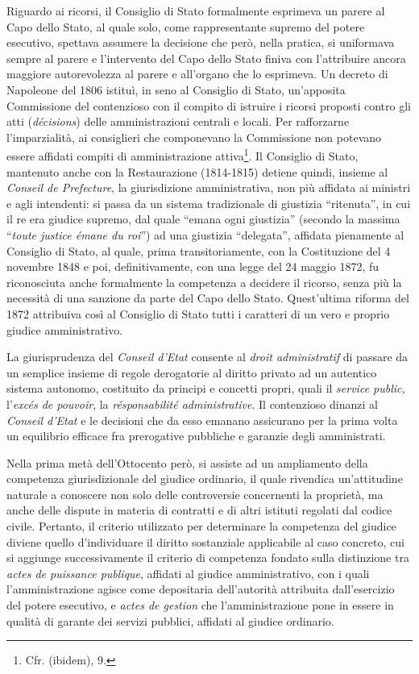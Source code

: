\documentclass[12pt,it,a4paper,]{report}
\begin{document}
Riguardo ai ricorsi, il Consiglio di Stato formalmente esprimeva un
parere al Capo dello Stato, al quale solo, come rappresentante supremo
del potere esecutivo, spettava assumere la decisione che però, nella
pratica, si uniformava sempre al parere e l'intervento del Capo dello
Stato finiva con l'attribuire ancora maggiore autorevolezza al parere e
all'organo che lo esprimeva. Un decreto di Napoleone del 1806 istituì,
in seno al Consiglio di Stato, un'apposita Commissione del contenzioso
con il compito di istruire i ricorsi proposti contro gli atti
(\emph{décisions}) delle amministrazioni centrali e locali. Per
rafforzarne l'imparzialità, ai consiglieri che componevano la
Commissione non potevano essere affidati compiti di amministrazione
attiva\footnote{Cfr. (ibidem), 9.}. Il Consiglio di Stato, mantenuto
anche con la Restaurazione (1814-1815) detiene quindi, insieme al
\emph{Conseil de Prefecture}, la giurisdizione amministrativa, non più
affidata ai ministri e agli intendenti: si passa da un sistema
tradizionale di giustizia ``ritenuta'', in cui il re era giudice
supremo, dal quale ``emana ogni giustizia'' (secondo la massima
``\emph{toute justice émane du roi}'') ad una giustizia ``delegata'',
affidata pienamente al Consiglio di Stato, al quale, prima
transitoriamente, con la Costituzione del 4 novembre 1848 e poi,
definitivamente, con una legge del 24 maggio 1872, fu riconosciuta anche
formalmente la competenza a decidere il ricorso, senza più la necessità
di una sanzione da parte del Capo dello Stato. Quest'ultima riforma del
1872 attribuiva così al Consiglio di Stato tutti i caratteri di un vero
e proprio giudice amministrativo.

La giurisprudenza del \emph{Conseil d'Etat} consente al \emph{droit
administratif} di passare da un semplice insieme di regole derogatorie
al diritto privato ad un autentico sistema autonomo, costituito da
principi e concetti propri, quali il \emph{service public,}
l'\emph{excés de pouvoir}, la \emph{résponsabilité administrative}. Il
contenzioso dinanzi al \emph{Conseil d'Etat} e le decisioni che da esso
emanano assicurano per la prima volta un equilibrio efficace fra
prerogative pubbliche e garanzie degli amministrati.

Nella prima metà dell'Ottocento però, si assiste ad un ampliamento della
competenza giurisdizionale del giudice ordinario, il quale rivendica
un'attitudine naturale a conoscere non solo delle controversie
concernenti la proprietà, ma anche delle dispute in materia di contratti
e di altri istituti regolati dal codice civile. Pertanto, il criterio
utilizzato per determinare la competenza del giudice diviene quello
d'individuare il diritto sostanziale applicabile al caso concreto, cui
si aggiunge successivamente il criterio di competenza fondato sulla
distinzione tra \emph{actes de puissance publique}, affidati al giudice
amministrativo, con i quali l'amministrazione agisce come depositaria
dell'autorità attribuita dall'esercizio del potere esecutivo, e
\emph{actes de gestion} che l'amministrazione pone in essere in qualità
di garante dei servizi pubblici, affidati al giudice ordinario.
\end{document}

